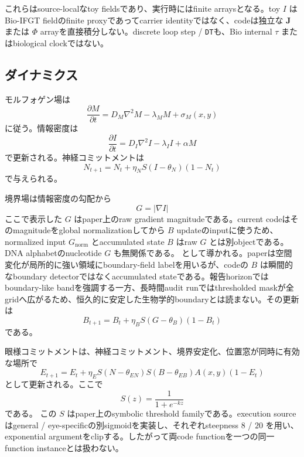 \documentclass[11pt]{ltjsarticle}
\newcommand{\I}{I}
\newcommand{\J}{\mathbf{J}}
\newcommand{\PhiI}{\Phi}
\begin{document}
これらはsource-localなtoy fieldsであり、実行時にはfinite arraysとなる。toy \(\I\) はBio-IFGT fieldのfinite proxyであってcarrier identityではなく、codeは独立な \(\J\) または \(\PhiI\) arrayを直接積分しない。discrete loop step / \texttt{DT}も、Bio internal \(\tau\) またはbiological clockではない。

\subsection{ダイナミクス}

モルフォゲン場は
\begin{equation}
  \frac{\partial M}{\partial t}=D_M\nabla^2M-\lambda_M M+\sigma_M(x,y)
\end{equation}
に従う。情報密度は
\begin{equation}
  \frac{\partial \I}{\partial t}=D_I\nabla^2\I-\lambda_I\I+\alpha M
\end{equation}
で更新される。神経コミットメントは
\begin{equation}
  N_{t+1}=N_t+\eta_N S(\I-\theta_N)(1-N_t)
\end{equation}
で与えられる。

境界場は情報密度の勾配から
\begin{equation}
  G=|\nabla\I|
\end{equation}
ここで表示した \(G\) はpaper上のraw gradient magnitudeである。current codeはそのmagnitudeをglobal normalizationしてから \(B\) updateのinputに使うため、normalized input \(G_{\mathrm{norm}}\) とaccumulated state \(B\) はraw \(G\) とは別objectである。DNA alphabetのnucleotide \(G\) も無関係である。
として導かれる。paperは空間変化が局所的に強い領域にboundary-field labelを用いるが、codeの \(B\) は瞬間的なboundary detectorではなくaccumulated stateである。報告horizonではboundary-like bandを強調する一方、長時間audit runではthresholded maskが全gridへ広がるため、恒久的に安定した生物学的boundaryとは読まない。その更新は
\begin{equation}
  B_{t+1}=B_t+\eta_B S(G-\theta_B)(1-B_t)
\end{equation}
である。

眼様コミットメントは、神経コミットメント、境界安定化、位置窓が同時に有効な場所で
\begin{equation}
  E_{t+1}=E_t+\eta_E S(N-\theta_{EN})S(B-\theta_{EB})A(x,y)(1-E_t)
\end{equation}
として更新される。ここで
\begin{equation}
  S(z)=\frac{1}{1+e^{-kz}}
\end{equation}
である。
この \(S\) はpaper上のsymbolic threshold familyである。execution sourceはgeneral / eye-specificの別sigmoidを実装し、それぞれsteepness \(8\) / \(20\) を用い、exponential argumentをclipする。したがって両code functionを一つの同一function instanceとは扱わない。
\end{document}
